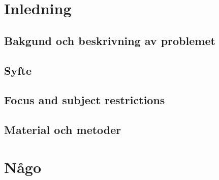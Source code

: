 
\section{Inledning}

\subsection{Bakgund och beskrivning av problemet}




\subsection{Syfte}



\subsection{Focus and subject restrictions}




\subsection{Material och metoder}



\newpage

\section{Någo}
